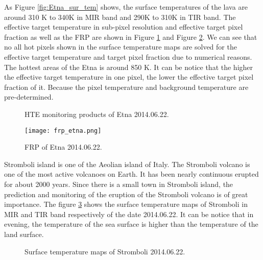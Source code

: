 \noindent As Figure \ref{fig:Etna_sur_tem} shows, the surface temperatures of the lava are around 310 K to 340K in MIR band and 290K to 310K in TIR band. The effective target temperature in sub-pixel resolution and effective target pixel fraction as well as the FRP are shown in Figure \ref{fig:Etna_HTE} and Figure \ref{fig:Etna_frp}. We can see that no all hot pixels shown in the surface temperature maps are solved for the effective target temperature and target pixel fraction due to numerical reasons. The hottest areas of the Etna is around 850 K. It can be notice that the higher the effective target temperature in one pixel, the lower the effective target pixel fraction of it. Because the pixel temperature and background temperature are pre-determined.\\

\begin{figure}[!htbp]
\centering
{}
\hspace{0.1in}
\caption{HTE monitoring products of Etna 2014.06.22.}
\label{fig:Etna_HTE}
\end{figure}

\begin{figure}[!htbp]
\centering
\texttt{[image: frp\_etna.png]}
\caption{FRP of Etna 2014.06.22.}
\label{fig:Etna_frp}
\end{figure}

\noindent Stromboli island is one of the Aeolian island of Italy. The Stromboli volcano is one of the most active volcanoes on Earth. It has been nearly continuous erupted for about 2000 years. Since there is a small town in Stromboli island, the prediction and monitoring of the eruption of the Stromboli volcano is of great importance. The figure \ref{fig:Strom_sur_tem} shows the surface temperature maps of Stromboli in MIR and TIR band respectively of the date 2014.06.22. It can be notice that in evening, the temperature of the sea surface is higher than the temperature of the land surface.\\

\begin{figure}
\centering
{}
\hspace{0.1in}
\caption{Surface temperature maps of Stromboli 2014.06.22.}
\label{fig:Strom_sur_tem}
\end{figure}

